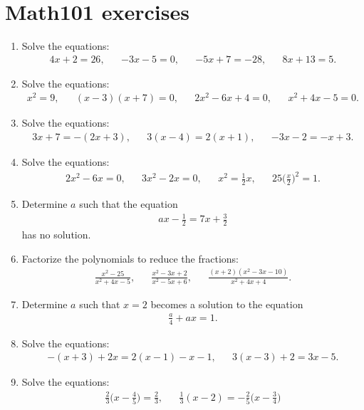 \newpage
\section{Math101 exercises}
\begin{enumerate}
\item Solve the equations:
\begin{align*}
4x+2=26,&& -3x-5=0,&&-5x+7=-28,&& 8x+13=5.
\end{align*}

\item Solve the equations:
\begin{align*}
x^2=9,&&(x-3)(x+7)=0,&& 2x^2-6x+4=0,&& x^2+4x-5=0.
\end{align*}

\item Solve the equations:
\begin{align*}
3x+7=-(2x+3),&& 3(x-4)=2(x+1),&& -3x-2=-x+3.
\end{align*}

\item Solve the equations:
\begin{align*}
2x^2-6x=0,&& 3x^2-2x=0,&& x^2=\frac{1}{2}x,&& 25\Big(\frac{x}{2}\Big)^2= 1.
\end{align*}

\item Determine $a$ such that the equation
\begin{align*}
ax-\frac{1}{2}=7x+\frac{3}{2}
\end{align*}
has no solution. 

\item Factorize the polynomials to reduce the fractions:
\begin{align*}
\frac{x^2-25}{x^2+4x-5},&&\frac{x^2-3x+2}{x^2-5x+6},&& \frac{(x+2)(x^2-3x-10)}{x^2+4x+4}.
\end{align*}

\item Determine $a$ such that $x=2$ becomes a solution to the equation
\begin{align*}
\frac{a}{4}+ax=1.
\end{align*}

\item Solve the equations:
\begin{align*}
-(x+3)+2x=2(x-1)-x-1 ,&& 3(x-3)+2=3x-5.
\end{align*}


\item Solve the equations:
\begin{align*}
\frac{2}{3}\Big(x- \frac{4}{5}\Big)=\frac{2}{3},&& \frac{1}{3}(x-2)=-\frac{2}{5}\Big(x-\frac{3}{4}\Big)
\end{align*}


\end{enumerate}
